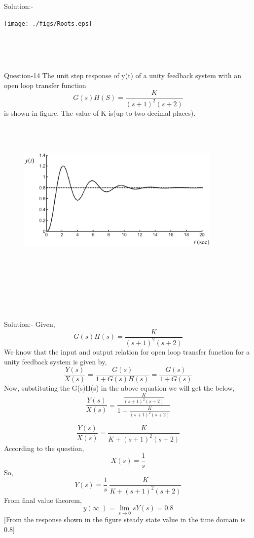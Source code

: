 \documentclass[journal,12pt,twocolumn]{IEEEtran}
\begin{document}
\begin{frame}{Solution:- }
\begin{frame}{}
\begin{frame}{}
\texttt{[image: ./figs/Roots.eps]}
\end{frame}
\\\\\\
\begin{frame}{Question-14 }
The unit step response of y(t) of a unity feedback system with an open loop transfer function  
\[ G(s)H(S)=\frac{K}{(s+1)^2(s+2)}  \]
is shown in figure. The value of K is(up to two decimal places).
\end{frame}
\begin{frame}{}
\begin{figure}[h]
    \includegraphics[width=10cm, height=8cm]{./figs/Screenshot(32).eps}    
\end{figure}
\end{frame}
\\\\\
\begin{frame}{Solution:- }
Given,
\[ G(s)H(s)=\frac{K}{(s+1)^2(s+2)}  \]
We know that the input and output relation for open loop transfer function for a unity feedback system is given by,
\[ \frac{Y(s)}{X(s)}=\frac{G(s)}{1+G(s)H(s)}=\frac{G(s)}{1+G(s)}\]
Now, substituting the G(s)H(s) in the above equation we will get the below,
\[ \frac{Y(s)}{X(s)}=\frac{\frac{K}{(s+1)^2(s+2)}}{1+\frac{K}{(s+1)^2(s+2)}}\]
\end{frame}
\begin{frame}{}
  \[ \frac{Y(s)}{X(s)}=\frac{K}{K+(s+1)^2(s+2)}  \]
According to the question, \[X(s)=\frac{1}{s}\]
So,\[Y(s)=\frac{1}{s} \  \frac{K}{K+(s+1)^2(s+2)}\]
From final value theorem,
\[y(\infty\;)=\lim_{s \rightarrow 0 }sY(s)=0.8\]
[From the response shown in the figure steady state value in the time domain is 0.8]

\end{frame}
\end{frame}
\end{frame}
\end{document}
